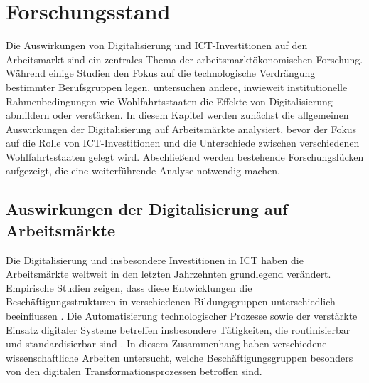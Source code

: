 
\section{Forschungsstand}

Die Auswirkungen von Digitalisierung und \ac{ICT}-Investitionen auf den Arbeitsmarkt sind 
ein zentrales Thema der arbeitsmarktökonomischen Forschung. Während einige Studien den 
Fokus auf die technologische Verdrängung bestimmter Berufsgruppen legen, untersuchen 
andere, inwieweit institutionelle Rahmenbedingungen wie Wohlfahrtsstaaten die Effekte von 
Digitalisierung abmildern oder verstärken. In diesem Kapitel werden zunächst die 
allgemeinen Auswirkungen der Digitalisierung auf Arbeitsmärkte analysiert, bevor der Fokus 
auf die Rolle von \ac{ICT}-Investitionen und die Unterschiede zwischen verschiedenen 
Wohlfahrtsstaaten gelegt wird. Abschließend werden bestehende Forschungslücken aufgezeigt, 
die eine weiterführende Analyse notwendig machen.


\subsection{Auswirkungen der Digitalisierung auf Arbeitsmärkte}

Die Digitalisierung und insbesondere Investitionen in \ac{ICT} haben die Arbeitsmärkte 
weltweit in den letzten Jahrzehnten grundlegend verändert. Empirische Studien zeigen, dass 
diese Entwicklungen die Beschäftigungsstrukturen in verschiedenen Bildungsgruppen 
unterschiedlich beeinflussen \parencite[S. 7]{autor2013thegrowth}. Die Automatisierung 
technologischer Prozesse sowie der verstärkte Einsatz digitaler Systeme betreffen 
insbesondere Tätigkeiten, die routinisierbar und standardisierbar sind 
\parencite[S. 20]{frey2013thefuture}. In diesem Zusammenhang haben verschiedene 
wissenschaftliche Arbeiten untersucht, welche Beschäftigungsgruppen besonders von den 
digitalen Transformationsprozessen betroffen sind.

